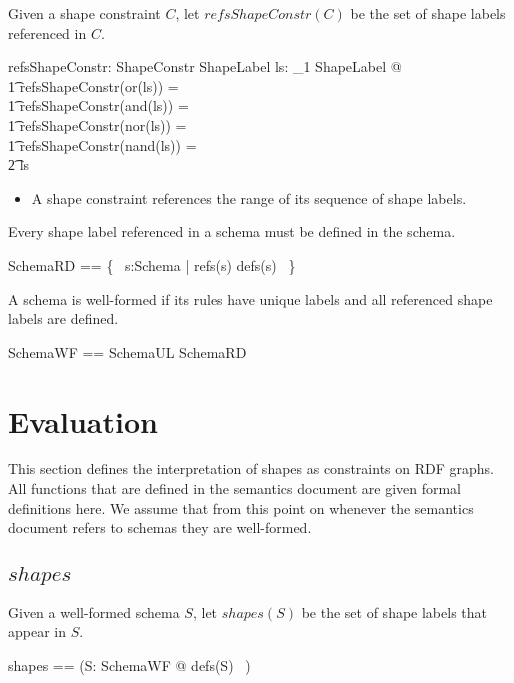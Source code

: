 \documentclass{article}
\begin{document}
Given a shape constraint $C$, let $refsShapeConstr(C)$ be the set of shape labels referenced in $C$.
\begin{axdef}
	refsShapeConstr: ShapeConstr \fun \finset ShapeLabel
\where
	\forall ls: \seq_1 ShapeLabel @ \\
\t1		refsShapeConstr(or(ls)) = \\
\t1		refsShapeConstr(and(ls)) = \\
\t1		refsShapeConstr(nor(ls)) = \\
\t1		refsShapeConstr(nand(ls)) = \\
\t2			\ran ls
\end{axdef}
\begin{itemize}
\item A shape constraint references the range of its sequence of shape labels.
\end{itemize}

Every shape label referenced in a schema must be defined in the schema.
\begin{zed}
	SchemaRD == \{~ s:Schema | refs(s) \subseteq defs(s) ~\}
\end{zed}

A schema is well-formed if its rules have unique labels and all referenced shape labels are defined.
\begin{zed}
	SchemaWF == SchemaUL \cap SchemaRD
\end{zed}

\section{Evaluation}
\label{sec-evaluation}
This section defines the interpretation of shapes as constraints on RDF graphs.
All functions that are defined in the semantics document are given formal definitions here.
We assume that from this point on whenever the semantics document refers to schemas they are well-formed.

\subsection{$shapes$}
Given a well-formed schema $S$, let $shapes(S)$ be the set of shape labels that appear in $S$.
\begin{zed}
	shapes == (\lambda S: SchemaWF @ defs(S) ~)
\end{zed}
\end{document}
